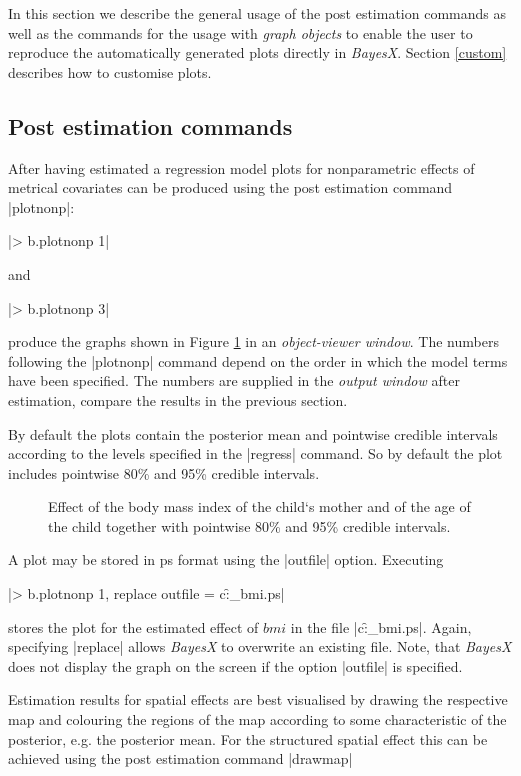 \documentclass[a4paper]{article}
\begin{document}
In this section we describe the general usage of the post
estimation commands as well as the commands for the usage with
{\em graph objects} to enable the user to reproduce the
automatically generated plots directly in {\em BayesX}. Section
\ref{custom} describes how to customise plots.

\subsection{Post estimation commands}

After having estimated a regression model plots for nonparametric effects of metrical covariates can be produced using the post
estimation command |plotnonp|:

|> b.plotnonp 1|

and

|> b.plotnonp 3|

produce the graphs shown in Figure \ref{bmi1} in an {\it object-viewer window}. The numbers following the |plotnonp| command
depend on the order in which the model terms have been specified. The numbers are supplied in the {\em output window} after
estimation, compare the results in the previous section.

By default the plots contain the posterior mean and pointwise credible intervals according to the levels specified in the
|regress| command. So by default the plot includes pointwise 80\% and 95\% credible intervals.

\begin{figure}[ht]
\begin{center}
 {\it\caption{Effect of
the body mass index of the child`s mother and of the age of the
child together with pointwise 80\% and 95\% credible intervals.
\label{bmi1}}}
\end{center}
\end{figure}

A plot may be stored in ps format using the |outfile| option. Executing

|> b.plotnonp 1, replace outfile = c:\data\f_bmi.ps|

stores the plot for the estimated effect of $bmi$ in the file |c:\data\f_bmi.ps|. Again, specifying |replace| allows {\it
BayesX} to overwrite an existing file. Note, that {\it BayesX} does not display the graph on the screen if the option |outfile|
is specified.

Estimation results for spatial effects are best visualised by drawing the respective map and colouring the regions of the map
according to some characteristic of the posterior, e.g. the posterior mean. For the structured spatial effect this can be
achieved using the post estimation command |drawmap|
\end{document}
